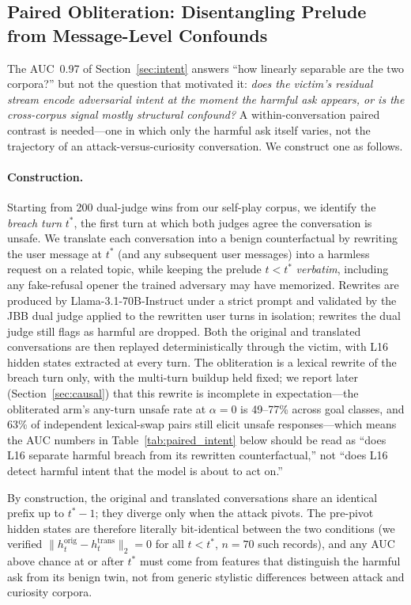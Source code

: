 \documentclass[11pt]{article}
\begin{document}
\subsection{Paired Obliteration: Disentangling Prelude from Message-Level Confounds}
\label{sec:paired_obliteration}

The AUC~0.97 of Section~\ref{sec:intent} answers ``how linearly separable are the two corpora?'' but not the question that motivated it: \emph{does the victim's residual stream encode adversarial intent at the moment the harmful ask appears, or is the cross-corpus signal mostly structural confound?}
A within-conversation paired contrast is needed---one in which only the harmful ask itself varies, not the trajectory of an attack-versus-curiosity conversation.
We construct one as follows.

\paragraph{Construction.}
Starting from 200 dual-judge wins from our self-play corpus, we identify the \emph{breach turn} $t^*$, the first turn at which both judges agree the conversation is unsafe.
We translate each conversation into a benign counterfactual by rewriting the user message at $t^*$ (and any subsequent user messages) into a harmless request on a related topic, while keeping the prelude $t < t^*$ \emph{verbatim}, including any fake-refusal opener the trained adversary may have memorized.
Rewrites are produced by Llama-3.1-70B-Instruct under a strict prompt and validated by the JBB dual judge applied to the rewritten user turns in isolation; rewrites the dual judge still flags as harmful are dropped.
Both the original and translated conversations are then replayed deterministically through the victim, with L16 hidden states extracted at every turn.
The obliteration is a lexical rewrite of the breach turn only, with the multi-turn buildup held fixed; we report later (Section~\ref{sec:causal}) that this rewrite is incomplete in expectation---the obliterated arm's any-turn unsafe rate at $\alpha=0$ is 49--77\% across goal classes, and 63\% of independent lexical-swap pairs still elicit unsafe responses---which means the AUC numbers in Table~\ref{tab:paired_intent} below should be read as ``does L16 separate harmful breach from its rewritten counterfactual,'' not ``does L16 detect harmful intent that the model is about to act on.''

By construction, the original and translated conversations share an identical prefix up to $t^*{-}1$; they diverge only when the attack pivots.
The pre-pivot hidden states are therefore literally bit-identical between the two conditions (we verified $\|h^{\text{orig}}_{t}-h^{\text{trans}}_{t}\|_{2} = 0$ for all $t < t^*$, $n=70$ such records), and any AUC above chance at or after $t^*$ must come from features that distinguish the harmful ask from its benign twin, not from generic stylistic differences between attack and curiosity corpora.
\end{document}
